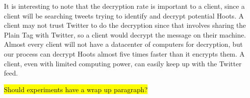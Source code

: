 It is interesting to note that the decryption rate is important to a client, since a client will be searching tweets trying to identify and decrypt potential Hoots. A client may not trust Twitter to do the decryption since that involves sharing the Plain Tag with Twitter, so a client would decrypt the message on their machine. Almost every client will not have a datacenter of computers for decryption, but our  process can decrypt Hoots almost five times faster than it encrypts them. A client, even with limited computing power, can easily keep up with the Twitter feed.

\hl{Should experiments have a wrap up paragraph?}